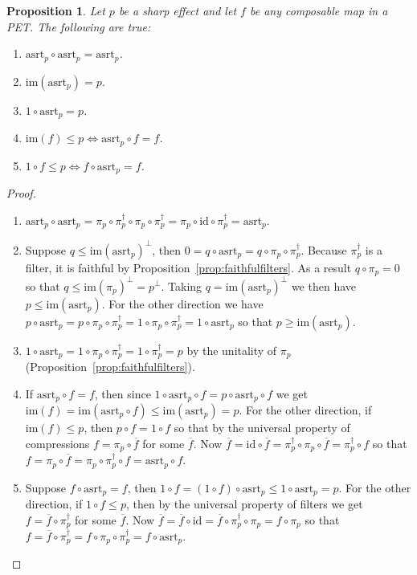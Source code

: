\documentclass[b5paper,onecolumn,12pt,accepted=2019-05-03, issue=1, volume=1, shorttitle=papers/compositionality-1-1]{compositionalityarticle}
\newcounter{counter}
\numberwithin{counter}{section}
\newtheorem{proposition}[counter]{Proposition}
\newcommand{\asrt}{\text{asrt}}
\newcommand{\id}{\text{id}}
\newcommand{\cl}[1]{\overline{#1}}
\newcommand{\im}[1]{\text{im}(#1)}
\begin{document}
\begin{proposition} \label{prop:assertmaps}
	\cite{basthesis} Let $p$ be a sharp effect and let $f$ be any composable map in a PET. The following are true:
	\begin{enumerate}
		\item $\asrt_p\circ \asrt_p = \asrt_p$.
		\item $\im{\asrt_p} = p$.
		\item $1\circ \asrt_p = p$.
		\item $\im{f}\leq p \iff \asrt_p\circ f = f$.
		\item $1\circ f \leq p \iff f\circ \asrt_p = f$.
	\end{enumerate}
\end{proposition}
\begin{proof} ~
	\begin{enumerate}
		\item $\asrt_p\circ \asrt_p = \pi_p\circ\pi_p^\dagger\circ\pi_p\circ\pi_p^\dagger = \pi_p\circ \id\circ \pi_p^\dagger = \asrt_p$.

		\item Suppose $q\leq \im{\asrt_p}^\perp$, then $0 = q\circ \asrt_p = q\circ \pi_p\circ \pi_p^\dagger$. Because $\pi_p^\dagger$ is a filter, it is faithful by Proposition~\ref{prop:faithfulfilters}. As a result $q\circ \pi_p =0$ so that $q\leq \im{\pi_p}^\perp = p^\perp$. Taking $q=\im{\asrt_p}^\perp$ we then have $p \leq \im{\asrt_p}$. For the other direction we have $p\circ \asrt_p = p\circ \pi_p \circ \pi_p^\dagger = 1\circ \pi_p\circ \pi_p^\dagger = 1\circ \asrt_p$ so that $p\geq \im{\asrt_p}$.

		\item $1\circ \asrt_p = 1\circ \pi_p \circ \pi_p^\dagger = 1\circ \pi_p^\dagger = p$ by the unitality of $\pi_p$ (Proposition~\ref{prop:faithfulfilters}).

		\item If $\asrt_p\circ f = f$, then since $1\circ \asrt_p\circ f = p\circ \asrt_p\circ f$ we get $\im{f} = {\im{\asrt_p\circ f}} \leq \im{\asrt_p} = p$. For the other direction, if $\im{f}\leq p$, then $p\circ f = 1\circ f$ so that by the universal property of compressions $f = \pi_p\circ \cl{f}$ for some $\cl{f}$. Now $\cl{f} = \id\circ \cl{f} = \pi_p^\dagger\circ \pi_p \circ \cl{f} = \pi_p^\dagger \circ f$ so that $f = \pi_p \circ \cl{f} = \pi_p\circ \pi_p^\dagger\circ f = \asrt_p\circ f$.
		\item Suppose $f\circ \asrt_p = f$, then $1\circ f = (1\circ f)\circ \asrt_p \leq 1\circ \asrt_p = p$. For the other direction, if $1\circ f \leq p$, then by the universal property of filters we get $f = \cl{f}\circ \pi_p^\dagger$ for some $\cl{f}$. Now $\cl{f} = \cl{f}\circ \id = \cl{f} \circ \pi_p^\dagger \circ \pi_p = f \circ \pi_p$ so that $f = \cl{f}\circ \pi_p^\dagger = f\circ \pi_p\circ \pi_p^\dagger = f\circ \asrt_p$. \qedhere
	\end{enumerate}
\end{proof}
\end{document}
